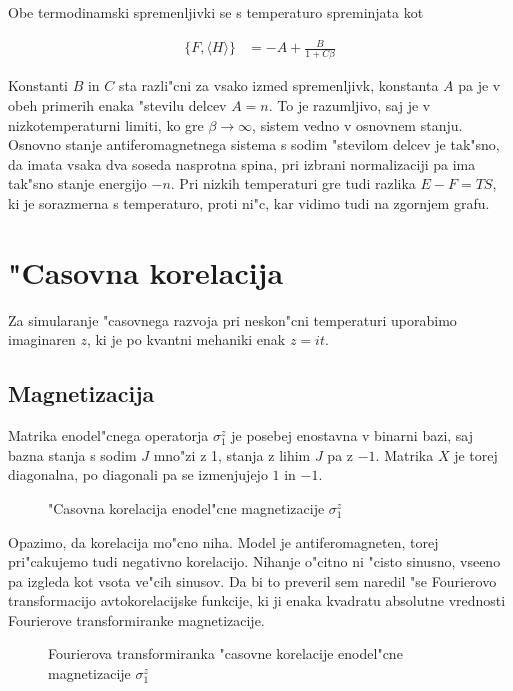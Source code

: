 \documentclass[a4paper,10pt]{article}
\begin{document}
Obe termodinamski spremenljivki se s temperaturo spreminjata kot

\begin{align}
 \{F,\langle H \rangle \} &= -A + \frac{B}{1 + C\beta}
\end{align}

Konstanti $B$ in $C$ sta razli"cni za vsako izmed spremenljivk, konstanta $A$ pa je v obeh primerih enaka "stevilu delcev $A = n$. 
To je razumljivo, saj je v nizkotemperaturni limiti, ko gre $\beta \to \infty$, sistem vedno v osnovnem stanju. 
Osnovno stanje antiferomagnetnega sistema s sodim "stevilom delcev je tak"sno, da imata vsaka dva soseda nasprotna spina, pri izbrani normalizaciji pa ima tak"sno stanje energijo $-n$. 
Pri nizkih temperaturi gre tudi razlika $E-F = TS$, ki je sorazmerna s temperaturo, proti ni"c, kar vidimo tudi na zgornjem grafu. 

\section{"Casovna korelacija}

Za simularanje "casovnega razvoja pri neskon"cni temperaturi uporabimo imaginaren $z$, ki je po kvantni mehaniki enak $z = it$. 

\subsection{Magnetizacija}
Matrika enodel"cnega operatorja $\sigma_1^z$ je posebej enostavna v binarni bazi, saj bazna stanja s sodim $J$ mno"zi z 1, stanja z lihim $J$ pa z $-1$. 
Matrika $X$ je torej diagonalna, po diagonali pa se izmenjujejo $1$ in $-1$. 

\begin{figure}[H]
\centering
 
 \caption{"Casovna korelacija enodel"cne magnetizacije $\sigma_1^z$}
\end{figure}

Opazimo, da korelacija mo"cno niha. Model je antiferomagneten, torej pri"cakujemo tudi negativno korelacijo. 
Nihanje o"citno ni "cisto sinusno, vseeno pa izgleda kot vsota ve"cih sinusov. 
Da bi to preveril sem naredil "se Fourierovo transformacijo avtokorelacijske funkcije, ki ji enaka kvadratu absolutne vrednosti Fourierove transformiranke magnetizacije. 

\begin{figure}[H]
\centering
 
 \caption{Fourierova transformiranka "casovne korelacije enodel"cne magnetizacije $\sigma_1^z$}
\end{figure}
\end{document}
